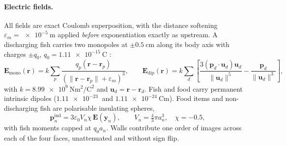 \paragraph{Electric fields.}
All fields are exact Coulomb superposition, with the distance softening
$\varepsilon_m=\SI{e-5}{\metre}$ applied \emph{before} exponentiation exactly as
upstream. A discharging fish carries two monopoles at $\pm\SI{0.5}{\centi\metre}$
along its body axis with charges $\pm q_0$, $q_0=\SI{1.11e-15}{\coulomb}$
\citep{chen2005modeling}:
\begin{equation}
\mathbf{E}_{\text{mono}}(\mathbf{r}) = k\sum_p
  \frac{q_p(\mathbf{r}-\mathbf{r}_p)}{(\lVert\mathbf{r}-\mathbf{r}_p\rVert+\varepsilon_m)^3},
\qquad
\mathbf{E}_{\text{dip}}(\mathbf{r}) = k\sum_d
  \left[\frac{3(\mathbf{p}_d\!\cdot\!\mathbf{u}_d)\mathbf{u}_d}{\lVert\mathbf{u}_d\rVert^5}
        -\frac{\mathbf{p}_d}{\lVert\mathbf{u}_d\rVert^3}\right],
\end{equation}
with $k=\SI{8.99e9}{\newton\metre\squared\per\coulomb\squared}$ and
$\mathbf{u}_d=\mathbf{r}-\mathbf{r}_d$. Fish and food carry permanent intrinsic
dipoles ($\SI{1.11e-23}{}$ and $\SI{1.11e-24}{\coulomb\metre}$). Food items and
non-discharging fish are polarisable insulating spheres,
\begin{equation}
\mathbf{p}^{\text{ind}}_n = 3\varepsilon_0 V_n \chi\, \mathbf{E}(\mathbf{y}_n),
\qquad V_n = \tfrac{4}{3}\pi a_n^3,\quad \chi=-0.5,
\end{equation}
with fish moments capped at $q_0 a_n$. Walls contribute one order of images
across each of the four faces, unattenuated and without sign flip.

